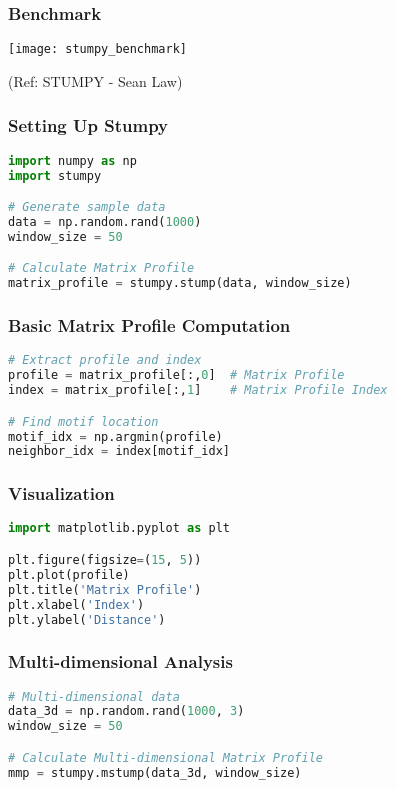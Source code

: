 \begin{frame}[fragile]\frametitle{Benchmark}

\begin{center}
\texttt{[image: stumpy\_benchmark]}

{\tiny (Ref: STUMPY - Sean Law)}		
\end{center}
	

\end{frame}

\begin{frame}[fragile]\frametitle{Setting Up Stumpy}
    \begin{lstlisting}[language=Python]
import numpy as np
import stumpy

# Generate sample data
data = np.random.rand(1000)
window_size = 50

# Calculate Matrix Profile
matrix_profile = stumpy.stump(data, window_size)
    \end{lstlisting}
\end{frame}

\begin{frame}[fragile]\frametitle{Basic Matrix Profile Computation}
    \begin{lstlisting}[language=Python]
# Extract profile and index
profile = matrix_profile[:,0]  # Matrix Profile
index = matrix_profile[:,1]    # Matrix Profile Index

# Find motif location
motif_idx = np.argmin(profile)
neighbor_idx = index[motif_idx]
    \end{lstlisting}
\end{frame}

\begin{frame}[fragile]\frametitle{Visualization}
    \begin{lstlisting}[language=Python]
import matplotlib.pyplot as plt

plt.figure(figsize=(15, 5))
plt.plot(profile)
plt.title('Matrix Profile')
plt.xlabel('Index')
plt.ylabel('Distance')
    \end{lstlisting}
\end{frame}

\begin{frame}[fragile]\frametitle{Multi-dimensional Analysis}
    \begin{lstlisting}[language=Python]
# Multi-dimensional data
data_3d = np.random.rand(1000, 3)
window_size = 50

# Calculate Multi-dimensional Matrix Profile
mmp = stumpy.mstump(data_3d, window_size)
    \end{lstlisting}
\end{frame}


